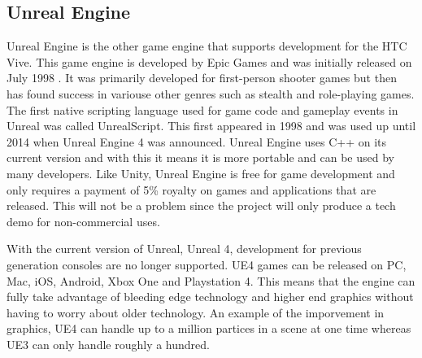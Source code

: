 \subsection{Unreal Engine}
Unreal Engine is the other game engine that supports development for the HTC Vive. This game engine is developed by Epic Games and was initially released on July 1998 \cite{unrealwiki}. It was primarily developed for first-person shooter games but then has found success in variouse other genres such as stealth and role-playing games. The first native scripting language used for game code and gameplay events in Unreal was called UnrealScript. This first appeared in 1998 and was used up until 2014 when Unreal Engine 4 was announced. Unreal Engine uses C++ on its current version and with this it means it is more portable and can be used by many developers. Like Unity, Unreal Engine is free for game development and only requires a payment of 5\% royalty on games and applications that are released\cite{whatisunreal}. This will not be a problem since the project will only produce a tech demo for non-commercial uses.
\newline
\par
With the current version of Unreal, Unreal 4, development for previous generation consoles are no longer supported. UE4 games can be released on PC, Mac, iOS, Android, Xbox One and Playstation 4\cite{unreal4nextgen}. This means that the engine can fully take advantage of bleeding edge technology and higher end graphics without having to worry about older technology. An example of the imporvement in graphics, UE4 can handle up to a million partices in a scene at one time whereas UE3 can only handle roughly a hundred.

